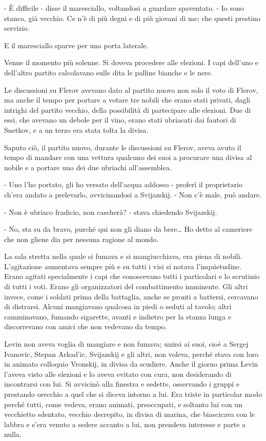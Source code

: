 - È difficile - disse il maresciallo, voltandosi a guardare spaventato. - Io sono stanco, già vecchio. Ce n'è di più degni e di più giovani di me; che questi prestino servizio. 

E il maresciallo sparve per una porta laterale. 

Venne il momento più solenne. Si doveva procedere alle elezioni. I capi dell'uno e dell'altro partito calcolavano sulle dita le palline bianche e le nere. 

Le discussioni su Flerov avevano dato al partito nuovo non solo il voto di Flerov, ma anche il tempo per portare a votare tre nobili che erano stati privati, dagli intrighi del partito vecchio, della possibilità di partecipare alle elezioni. Due di essi, che avevano un debole per il vino, erano stati ubriacati dai fautori di Snetkov, e a un terzo era stata tolta la divisa. 

Saputo ciò, il partito nuovo, durante le discussioni su Flerov, aveva avuto il tempo di mandare con una vettura qualcuno dei suoi a procurare una divisa al nobile e a portare uno dei due ubriachi all'assemblea. 

- Uno l'ho portato, gli ho versato dell'acqua addosso - proferì il proprietario ch'era andato a prelevarlo, avvicinandosi a Svijazskij. - Non c'è male, può andare. 

- Non è ubriaco fradicio, non cascherà? - stava chiedendo Svijazskij. 

- No, sta su da bravo, purché qui non gli diano da bere\ldots{} Ho detto al cameriere che non gliene dia per nessuna ragione al mondo. 

La sala stretta nella quale si fumava e si mangiucchiava, era piena di nobili. L'agitazione aumentava sempre più e su tutti i visi si notava l'inquietudine. Erano agitati specialmente i capi che conoscevano tutti i particolari e lo scrutinio di tutti i voti. Erano gli organizzatori del combattimento imminente. Gli altri invece, come i soldati prima della battaglia, anche se pronti a battersi, cercavano di distrarsi. Alcuni mangiavano qualcosa in piedi o seduti al tavolo; altri camminavano, fumando sigarette, avanti e indietro per la stanza lunga e discorrevano con amici che non vedevano da tempo. 

Levin non aveva voglia di mangiare e non fumava; unirsi ai suoi, cioè a Sergej Ivanovic, Stepan Arkad'ic, Svijazskij e gli altri, non voleva, perché stava con loro in animato colloquio Vronskij, in divisa da scudiere. Anche il giorno prima Levin l'aveva visto alle elezioni e lo aveva evitato con cura, non desiderando di incontrarsi con lui. Si avvicinò alla finestra e sedette, osservando i gruppi e prestando orecchio a quel che si diceva intorno a lui. Era triste in particolar modo perché tutti, come vedeva, erano animati, preoccupati, e soltanto lui con un vecchietto sdentato, vecchio decrepito, in divisa di marina, che biascicava con le labbra e s'era venuto a sedere accanto a lui, non prendeva interesse e parte a nulla. 

